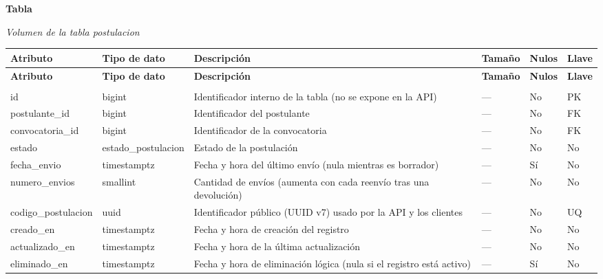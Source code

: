 \label{tab:volumen_postulacion}
\noindent\textbf{Tabla~\thetable}\par\nopagebreak
\noindent\textit{Volumen de la tabla postulacion}\par\nopagebreak
\begingroup\small\linespread{1}\selectfont\setlength{\tabcolsep}{4pt}
\begin{longtable}{>{\raggedright\arraybackslash}p{3.4cm} >{\raggedright\arraybackslash}p{2.5cm} >{\raggedright\arraybackslash}p{4.8cm} >{\centering\arraybackslash}p{1.6cm}>{\centering\arraybackslash}p{1.1cm} >{\centering\arraybackslash}p{1.3cm}}
\toprule
\textbf{Atributo} & \textbf{Tipo de dato} & \textbf{Descripción} & \textbf{Tamaño} & \textbf{Nulos} & \textbf{Llave} \\
\midrule
\endfirsthead
\toprule
\textbf{Atributo} & \textbf{Tipo de dato} & \textbf{Descripción} & \textbf{Tamaño} & \textbf{Nulos} & \textbf{Llave} \\
\midrule
\endhead
\endfoot
\bottomrule
\multicolumn{6}{l}{\textit{Nota.} Elaboración propia.} \\
\endlastfoot
id & bigint & Identificador interno de la tabla (no se expone en la API) & — & No & PK \\
postulante\_\allowbreak{}id & bigint & Identificador del postulante & — & No & FK \\
convocatoria\_\allowbreak{}id & bigint & Identificador de la convocatoria & — & No & FK \\
estado & estado\_\allowbreak{}postulacion & Estado de la postulación & — & No & No \\
fecha\_\allowbreak{}envio & timestamptz & Fecha y hora del último envío (nula mientras es borrador) & — & Sí & No \\
numero\_\allowbreak{}envios & smallint & Cantidad de envíos (aumenta con cada reenvío tras una devolución) & — & No & No \\
codigo\_\allowbreak{}postulacion & uuid & Identificador público (UUID v7) usado por la API y los clientes & — & No & UQ \\
creado\_\allowbreak{}en & timestamptz & Fecha y hora de creación del registro & — & No & No \\
actualizado\_\allowbreak{}en & timestamptz & Fecha y hora de la última actualización & — & No & No \\
eliminado\_\allowbreak{}en & timestamptz & Fecha y hora de eliminación lógica (nula si el registro está activo) & — & Sí & No \\
\end{longtable}
\endgroup
\addtocounter{table}{-1}

